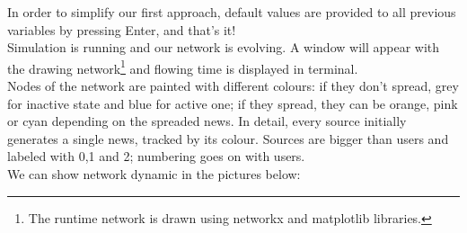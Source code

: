 In order to simplify our first approach, default values are provided to all previous variables by pressing Enter, and that's it!\\
Simulation is running and our network is evolving. A window will appear with the drawing network\footnote{The runtime network is drawn using networkx and matplotlib libraries.} and flowing time is displayed in terminal. \\
Nodes of the network are painted with different colours: if they don't spread, grey for inactive state and blue for active one; if they spread, they can be orange, pink or cyan depending on the spreaded news. In detail, every source initially generates a single news, tracked by its colour. Sources are bigger than users and labeled with 0,1 and 2; numbering goes on with users.\\
We can show network dynamic in the pictures below:
